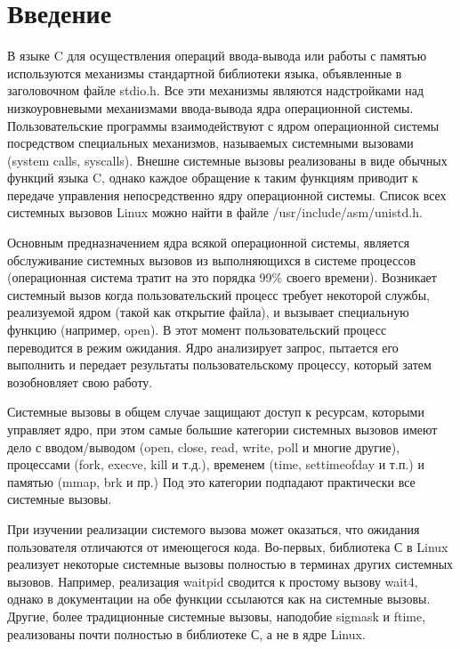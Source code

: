 \documentclass[a4paper, 12pt]{article}		%
\begin{document}
\tableofcontents



\newpage
\section*{Введение}

В языке C для осуществления операций ввода-вывода или работы с памятью используются механизмы стандартной библиотеки языка, объявленные в заголовочном файле stdio.h. Все эти механизмы являются надстройками над низкоуровневыми механизмами ввода-вывода ядра операционной системы. Пользовательские программы взаимодействуют с ядром операционной системы посредством специальных механизмов, называемых системными вызовами (system calls, syscalls). Внешне системные вызовы реализованы в виде обычных функций языка C, однако каждое обращение к таким функциям приводит к передаче управления непосредственно ядру операционной системы. Список всех системных вызовов Linux можно найти в файле /usr/include/asm/unistd.h\cite{IvanovN}.

Основным предназначением ядра всякой операционной системы, является обслуживание системных вызовов из выполняющихся в системе процессов (операционная система тратит на это порядка 99\% своего времени)\cite{Cilyuric}. Возникает системный вызов когда пользовательский процесс требует некоторой службы, реализуемой ядром (такой как открытие файла), и вызывает специальную функцию (например, open). В этот момент пользовательский процесс переводится в режим ожидания. Ядро анализирует запрос, пытается его выполнить и передает результаты пользовательскому процессу, который затем возобновляет свою работу. 

Системные вызовы в общем случае защищают доступ к ресурсам, которыми управляет ядро, при этом самые большие категории системных вызовов имеют дело с вводом/выводом (open, close, read, write, poll и многие другие), процессами (fork, execve, kill и т.д.), временем (time, settimeofday и т.п.) и памятью (mmap, brk и пр.) Под это категории подпадают практически все системные вызовы\cite{Maxwell}.

При изучении реализации системого вызова может оказаться, что ожидания пользователя отличаются от имеющегося кода. Во-первых, библиотека С в Linux реализует некоторые системные вызовы полностью в терминах других системных вызовов. Например, реализация waitpid сводится к простому вызову wait4, однако в документации на обе функции ссылаются как на системные вызовы. Другие, более традиционные системные вызовы, наподобие sigmask и ftime, реализованы почти полностью в библиотеке С, а не в ядре Linux.
\end{document}
